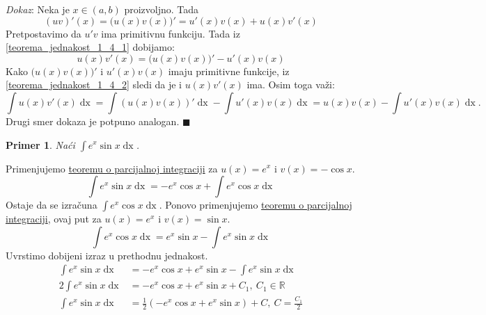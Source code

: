 \documentclass{article}
\newtheorem{prim}{Primer}[section]
\DeclareMathOperator{\dx}{dx}
\begin{document}
\textit{Dokaz}: Neka je $x \in \left(a, b\right)$ proizvoljno. Tada
\begin{equation}\label{teorema_jednakost_1_4_1}
    \left(uv\right)'\left(x\right) = \bigl(u\left(x\right) v\left(x\right)\bigr)' = u'\left(x\right)v\left(x\right) + u\left(x\right)v'\left(x\right)
\end{equation}
Pretpostavimo da $u'v$ ima primitivnu funkciju. Tada iz \eqref{teorema_jednakost_1_4_1} dobijamo:
\begin{equation}\label{teorema_jednakost_1_4_2}
    u\left(x\right)v'\left(x\right) = \bigl(u\left(x\right) v\left(x\right)\bigr)' - u'\left(x\right)v\left(x\right)
\end{equation}
Kako $\bigl(u\left(x\right)v\left(x\right)\bigr)'$ i $u'\left(x\right)v\left(x\right)$ imaju primitivne funkcije,
iz \eqref{teorema_jednakost_1_4_2} sledi da je i $u\left(x\right)v'\left(x\right)$ ima. Osim toga važi:
$$\int u\left(x\right)v'\left(x\right)\dx = \int\left(u\left(x\right)v\left(x\right)\right)'\dx - \int u'\left(x\right)v\left(x\right)\dx = u\left(x\right)v\left(x\right) -\int u'\left(x\right)v\left(x\right)\dx.$$
Drugi smer dokaza je potpuno analogan.
\null\hfill $\blacksquare$\par

\begin{primbox}
    \label{primer_1.13}
    \begin{prim}
        Naći $\displaystyle\int e^x \sin x \dx$.
    \end{prim}
    Primenjujemo \hyperref[teorema_1.4]{teoremu o parcijalnoj integraciji} za $u\left(x\right) = e^x$ i $v\left(x\right) = -\cos x$.
    $$\displaystyle\int e^x\sin x \dx = -e^x\cos x + \int e^x \cos x\dx$$
    Ostaje da se izračuna $\displaystyle\int e^x\cos x \dx$. Ponovo primenjujemo \hyperref[teorema_1.4]{teoremu o parcijalnoj integraciji}, ovaj
    put za $u\left(x\right) = e^x$ i $ v\left(x\right) = \sin x$.
    $$\displaystyle\int e^x\cos x \dx = e^x\sin x - \int e^x\sin x \dx$$
    Uvrstimo dobijeni izraz u prethodnu jednakost.
    \begin{align*}
        \int e^x \sin x \dx  & = -e^x\cos x + e^x \sin x - \int e^x \sin x \dx                       \\
        2\int e^x \sin x \dx & = -e^x\cos x + e^x \sin x +C_1,\ C_1\in\mathbb{R}                     \\
        \int e^x \sin x \dx  & = \frac{1}{2}\left(-e^x\cos x + e^x \sin x\right)+C,\ C=\frac{C_1}{2}
    \end{align*}
\end{primbox}
\end{document}
